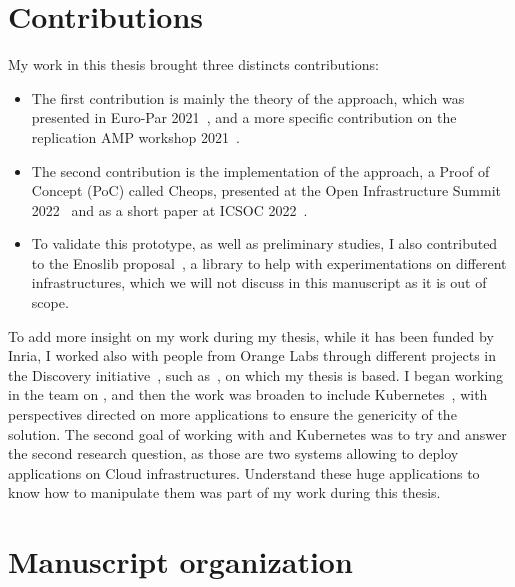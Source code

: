 


\section*{Contributions}

My work in this thesis brought three distincts contributions:
\begin{itemize}
\item[\cloud] The first contribution is mainly the theory of the
  approach, which was presented in Euro-Par 2021~\cite{CDL21}, and a
  more specific contribution on the replication AMP workshop
  2021~\cite{DCL21}.

\item[\cloud] The second contribution is the implementation of the
  approach, a Proof of Concept (\acrlong{PoC}) called Cheops,
  presented at the Open Infrastructure Summit 2022~\cite{OIS-Berlin22,
    OIS-Berlin22-video} and as a short paper at ICSOC
  2022~\cite{DAL22true}.

\item[\cloud] To validate this prototype, as well as preliminary
  studies, I also contributed to the Enoslib proposal~\cite{CDVL+21,
    enoslib}, a library to help with experimentations on different
  infrastructures, which we will not discuss in this manuscript as it
  is out of scope.
\end{itemize}

To add more insight on my work during my thesis, while it has been
funded by Inria, I worked also with people from Orange Labs through
different projects in the Discovery initiative~\cite{discovery}, such
as~\cite{CDVL+21, DCL18, juice, ELNC20}, on which my thesis is based.
%
I began working in the team on \os, and then the work was broaden to
include Kubernetes~\cite{k8s}, with perspectives directed on more
applications to ensure the genericity of the solution.
%
The second goal of working with \os and Kubernetes was to try and
answer the second research question, as those are two systems allowing
to deploy applications on Cloud infrastructures.
%
Understand these huge applications to know how to manipulate them was
part of my work during this thesis.



\section*{Manuscript organization}

